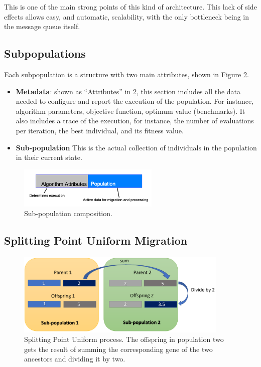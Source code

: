 \documentclass[runningheads]{llncs}
\begin{document}
This is one of the main strong points of this kind of
architecture. This lack of side effects allows easy, and automatic,
scalability, with the only bottleneck being in the message queue
itself.

\subsection{Subpopulations}

Each subpopulation is a structure with two main attributes, shown in
Figure \ref{fig4}.

\begin{itemize}
  \item {\bf Metadata}: shown as ``Attributes'' in \ref{fig4}, this
    section includes all the data needed 
  to configure and report the execution of the population.
  For instance, algorithm parameters, objective function, 
  optimum value (benchmarks). It also includes a trace of the execution, 
  for instance, the number of evaluations per iteration, 
  the best individual, and its fitness value.   
  \item {\bf Sub-population} This is the actual collection of individuals
  in the population in their current state.    
\end{itemize}
%
\begin{figure}[htp]
  \centering
  \includegraphics[width=0.6\textwidth]{img/subpopulationDefinition.png}
  \caption{Sub-population composition.} \label{fig3}
\end{figure}


\subsection{Splitting Point Uniform Migration} 
%
\begin{figure}[htp]
  \centering
  \includegraphics[width=0.9\textwidth]{img/splittinPointUniform.png}
  \caption{Splitting Point Uniform process. The offspring in
    population two gets the result of summing the corresponding gene
    of the two ancestors and dividing it by two.} \label{fig4}

\end{figure}
\end{document}
